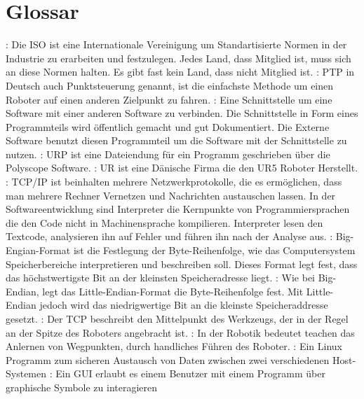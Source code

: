  \chapter{Glossar}
 \label{sec:Glossar_glo}

\begin{acronym}[Syntax Highligting]%
 
 : Die ISO ist eine Internationale Vereinigung um Standartisierte Normen in der Industrie zu erarbeiten und festzulegen. Jedes Land, dass Mitglied ist, muss sich an diese Normen halten. Es gibt fast kein Land, dass nicht Mitglied ist.
 : PTP in Deutsch auch Punktsteuerung genannt, ist die einfachste Methode um einen Roboter auf einen anderen Zielpunkt zu fahren.
 : Eine Schnittstelle um eine Software mit einer anderen Software zu verbinden. Die Schnittstelle in Form eines Programmteils wird öffentlich gemacht und gut Dokumentiert. Die Externe Software benutzt diesen Programmteil um die Software mit der Schnittstelle zu nutzen.
 : URP ist eine Dateiendung für ein Programm geschrieben über die Polyscope Software.
 : UR ist eine Dänische Firma die den UR5 Roboter Herstellt.
 : TCP/IP ist beinhalten mehrere Netzwerkprotokolle, die es ermöglichen, dass man mehrere Rechner Vernetzen und Nachrichten austauschen lassen.
  In der Softwareentwicklung sind Interpreter die Kernpunkte von Programmiersprachen die den Code nicht in Machinensprache kompilieren. Interpreter lesen den Textcode, analysieren ihn auf Fehler und führen ihn nach der Analyse aus.
 : Big-Engian-Format ist die Festlegung der Byte-Reihenfolge, wie das Computersystem Speicherbereiche interpretieren und beschreiben soll. Dieses Format legt fest, dass das höchstwertigste Bit an der kleinsten Speicheradresse liegt.
 : Wie bei \acs{Big-Endian}, legt das Little-Endian-Format die Byte-Reihenfolge fest. Mit Little-Endian jedoch wird das niedrigwertige Bit an die kleinste Speicheraddresse gesetzt.
 : Der TCP beschreibt den Mittelpunkt des Werkzeugs, der in der Regel an der Spitze des Roboters angebracht ist.
 : In der Robotik bedeutet teachen das Anlernen von Wegpunkten, durch handliches Führen des Roboter.
 : Ein Linux Programm zum sicheren Austausch von Daten zwischen zwei verschiedenen Host-Systemen
 : Ein GUI erlaubt es einem Benutzer mit einem Programm über graphische Symbole zu interagieren
\end{acronym}
